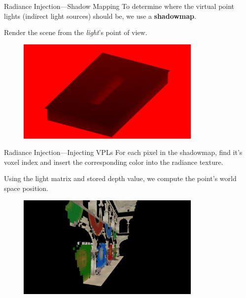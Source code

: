 \documentclass[10pt]{beamer}
\begin{document}
\begin{frame}{Radiance Injection---Shadow Mapping}
  To determine where the virtual point lights (indirect light sources) should be, we use a \textbf{shadowmap}.

  Render the scene from the \textit{light}'s point of view.


  \begin{figure}
    \includegraphics[width=0.8\textwidth]{shadowmap}
  \end{figure}
\end{frame}

\begin{frame}{Radiance Injection---Injecting VPLs}
  For each pixel in the shadowmap, find it's voxel index and insert the corresponding color into the radiance texture.

  Using the light matrix and stored depth value, we compute the point's world space position.

  \begin{figure}
    \includegraphics[width=0.8\textwidth]{radiance_nolighting}
  \end{figure}
\end{frame}
\end{document}
